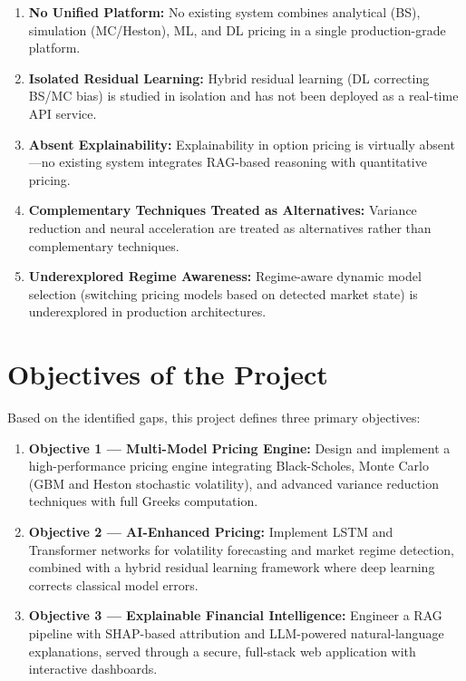 \documentclass[12pt,a4paper]{report}
\begin{document}
\begin{enumerate}
    \item \textbf{No Unified Platform:} No existing system combines analytical (BS), simulation (MC/Heston), ML, and DL pricing in a single production-grade platform.
    \item \textbf{Isolated Residual Learning:} Hybrid residual learning (DL correcting BS/MC bias) is studied in isolation and has not been deployed as a real-time API service.
    \item \textbf{Absent Explainability:} Explainability in option pricing is virtually absent---no existing system integrates RAG-based reasoning with quantitative pricing.
    \item \textbf{Complementary Techniques Treated as Alternatives:} Variance reduction and neural acceleration are treated as alternatives rather than complementary techniques.
    \item \textbf{Underexplored Regime Awareness:} Regime-aware dynamic model selection (switching pricing models based on detected market state) is underexplored in production architectures.
\end{enumerate}

\section{Objectives of the Project}

Based on the identified gaps, this project defines three primary objectives:

\begin{enumerate}
    \item \textbf{Objective 1 --- Multi-Model Pricing Engine:} Design and implement a high-performance pricing engine integrating Black-Scholes, Monte Carlo (GBM and Heston stochastic volatility), and advanced variance reduction techniques with full Greeks computation.

    \item \textbf{Objective 2 --- AI-Enhanced Pricing:} Implement LSTM and Transformer networks for volatility forecasting and market regime detection, combined with a hybrid residual learning framework where deep learning corrects classical model errors.

    \item \textbf{Objective 3 --- Explainable Financial Intelligence:} Engineer a RAG pipeline with SHAP-based attribution and LLM-powered natural-language explanations, served through a secure, full-stack web application with interactive dashboards.
\end{enumerate}
\end{document}
